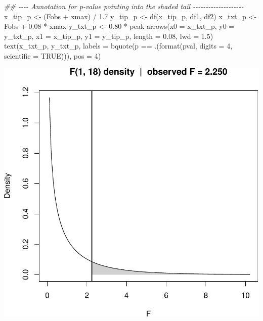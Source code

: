 \documentclass[
  letterpaper,
]{scrbook}
\newenvironment{Shaded}{\begin{snugshade}}{\end{snugshade}}
\newcommand{\AttributeTok}[1]{\textcolor[rgb]{0.40,0.45,0.13}{#1}}
\newcommand{\ConstantTok}[1]{\textcolor[rgb]{0.56,0.35,0.01}{#1}}
\newcommand{\DecValTok}[1]{\textcolor[rgb]{0.68,0.00,0.00}{#1}}
\newcommand{\DocumentationTok}[1]{\textcolor[rgb]{0.37,0.37,0.37}{\textit{#1}}}
\newcommand{\FloatTok}[1]{\textcolor[rgb]{0.68,0.00,0.00}{#1}}
\newcommand{\FunctionTok}[1]{\textcolor[rgb]{0.28,0.35,0.67}{#1}}
\newcommand{\NormalTok}[1]{\textcolor[rgb]{0.00,0.23,0.31}{#1}}
\newcommand{\OtherTok}[1]{\textcolor[rgb]{0.00,0.23,0.31}{#1}}
\newcommand{\SpecialCharTok}[1]{\textcolor[rgb]{0.37,0.37,0.37}{#1}}
\begin{document}
\begin{Shaded}
\begin{Highlighting}[]
\DocumentationTok{\#\# {-}{-}{-}{-} Annotation for p{-}value pointing into the shaded tail {-}{-}{-}{-}{-}{-}{-}{-}{-}{-}{-}{-}{-}{-}{-}{-}{-}{-}{-}{-}}
\NormalTok{x\_tip\_p }\OtherTok{\textless{}{-}}\NormalTok{ (Fobs }\SpecialCharTok{+}\NormalTok{ xmax) }\SpecialCharTok{/} \FloatTok{1.7}
\NormalTok{y\_tip\_p }\OtherTok{\textless{}{-}} \FunctionTok{df}\NormalTok{(x\_tip\_p, df1, df2)}
\NormalTok{x\_txt\_p }\OtherTok{\textless{}{-}}\NormalTok{ Fobs }\SpecialCharTok{+} \FloatTok{0.08} \SpecialCharTok{*}\NormalTok{ xmax}
\NormalTok{y\_txt\_p }\OtherTok{\textless{}{-}} \FloatTok{0.80} \SpecialCharTok{*}\NormalTok{ peak}
\FunctionTok{arrows}\NormalTok{(}\AttributeTok{x0 =}\NormalTok{ x\_txt\_p, }\AttributeTok{y0 =}\NormalTok{ y\_txt\_p, }\AttributeTok{x1 =}\NormalTok{ x\_tip\_p, }\AttributeTok{y1 =}\NormalTok{ y\_tip\_p,}
       \AttributeTok{length =} \FloatTok{0.08}\NormalTok{, }\AttributeTok{lwd =} \FloatTok{1.5}\NormalTok{)}
\FunctionTok{text}\NormalTok{(x\_txt\_p, y\_txt\_p,}
     \AttributeTok{labels =} \FunctionTok{bquote}\NormalTok{(p }\SpecialCharTok{==}\NormalTok{ .(}\FunctionTok{format}\NormalTok{(pval, }\AttributeTok{digits =} \DecValTok{4}\NormalTok{, }\AttributeTok{scientific =} \ConstantTok{TRUE}\NormalTok{))),}
     \AttributeTok{pos =} \DecValTok{4}\NormalTok{)}
\end{Highlighting}
\end{Shaded}

\includegraphics{unit2-slr/slr_files/figure-pdf/unnamed-chunk-3-1.pdf}
\end{document}

